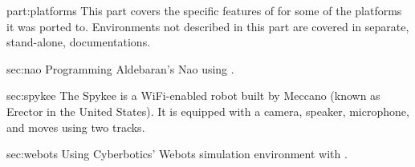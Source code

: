 \begin{partDescription}{part:platforms}
  {
    This part covers the specific features of \urbi for some of the
    platforms it was ported to.  Environments not described in this
    part are covered in separate, stand-alone, documentations.
  }
\item[sec:nao]
  Programming Aldebaran's Nao using \urbi.

\item[sec:spykee] The Spykee is a WiFi-enabled robot built by Meccano
  (known as Erector in the United States). It is equipped with a
  camera, speaker, microphone, and moves using two tracks.

\item[sec:webots] Using Cyberbotics' Webots simulation environment
  with \urbi.
\end{partDescription}
